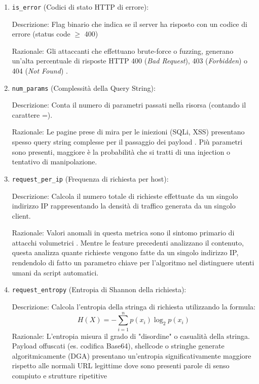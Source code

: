 \begin{enumerate}
            \renewcommand{\labelenumii}{\theenumi.\arabic{enumii}}
            \begin{enumerate}
                  \item \texttt{is\_error} (Codici di stato HTTP di errore):

                        Descrizione: Flag binario che indica se il server ha risposto con un codice di errore (status code $\geq$ 400)

                        Razionale: Gli attaccanti che effettuano brute-force o fuzzing, generano un'alta percentuale di risposte HTTP 400 (\emph{Bad Request}), 403 (\emph{Forbidden}) o 404 (\emph{Not Found}) \parencite{kruegel2003anomaly}.

                  \item \texttt{num\_params} (Complessità della Query String):

                        Descrizione: Conta il numero di parametri passati nella risorsa (contando il carattere =).

                        Razionale: Le pagine prese di mira per le iniezioni (SQLi, XSS) presentano spesso query string complesse per il passaggio dei payload \parencite{kruegel2003anomaly}. Più parametri sono presenti, maggiore è la probabilità che si tratti di una injection o tentativo di manipolazione.

                  \item \texttt{request\_per\_ip} (Frequenza di richiesta per host):

                        Descrizione: Calcola il numero totale di richieste effettuate da un singolo indirizzo IP rappresentando la densità di traffico generata da un singolo client.

                        Razionale: Valori anomali in questa metrica sono il sintomo primario di attacchi volumetrici \parencite{mitrebruteforce} \parencite{mitredos} \parencite{thottan2003anomaly}. Mentre le feature precedenti analizzano il contenuto, questa analizza quante richieste vengono fatte da un singolo indirizzo IP, rendendolo di fatto un parametro chiave per l’algoritmo nel distinguere utenti umani da script automatici.

                  \item \texttt{request\_entropy} (Entropia di Shannon della richiesta):

                        Descrizione: Calcola l'entropia della stringa di richiesta utilizzando la formula:
                        \begin{equation}
                              H(X) = - \sum_{i=1}^{n} p(x_i) \log_{2} p(x_i)
                        \end{equation}
                        Razionale: L'entropia misura il grado di "disordine" o casualità della stringa. Payload offuscati (es. codifica Base64), shellcode o stringhe generate algoritmicamente (DGA) presentano un'entropia significativamente maggiore rispetto alle normali URL legittime dove sono presenti parole di senso compiuto e strutture ripetitive \parencite{lyda2007using}


\end{enumerate}
\end{enumerate}
